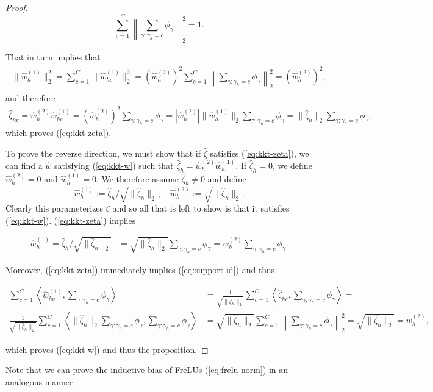 \documentclass{article}
\theoremstyle{plain}
\theoremstyle{definition}
\theoremstyle{remark}
\begin{document}
\begin{proof}
\begin{equation}
\label{eq:support-id}
\sum_{c=1}^C\left\|\sum_{\gamma:\gamma_h=c}\phi_{\gamma}\right\|_2^2=1.
\end{equation}

That in turn implies that
\begin{align}
\begin{aligned}
\label{w-12-id}
\|\hat{w}^{(1)}_h\|_2^2=\sum_{c=1}^C\|\hat{w}^{(1)}_{hc}\|_2^2=
\left(\hat{w}^{(2)}_h\right)^2\sum_{c=1}^C\left\|\sum_{\gamma:\gamma_h=c}\phi_{\gamma}\right\|_2^2=\left(\hat{w}^{(2)}_h\right)^2,
\end{aligned}
\end{align}
and therefore
\begin{align*}
\hat{\zeta}_{hc}=\hat{w}^{(2)}_h\hat{w}^{(1)}_{hc}=\left(\hat{w}^{(2)}_h\right)^2\sum_{\gamma:\gamma_h=c}\phi_{\gamma}=
|\hat{w}_h^{(2)}|\|\hat{w}_h^{(1)}\|_2\sum_{\gamma:\gamma_h=c}\phi_{\gamma}=\|\hat{\zeta}_{h}\|_2\sum_{\gamma:\gamma_h=c}\phi_{\gamma},
\end{align*}
which proves (\ref{eq:kkt-zeta}).

To prove the reverse direction, we must show that if $\hat{\zeta}$ satisfies (\ref{eq:kkt-zeta}), we can find a $\hat{w}$ satisfying (\ref{eq:kkt-w}) such that $\hat{\zeta}_h=\hat{w}_h^{(2)}\hat{w}_h^{(1)}$.
If $\hat{\zeta}_h=0$, we define $\hat{w}_h^{(2)}=0$ and $\hat{w}_h^{(1)}=0$. We therefore assume $\hat{\zeta}_h\neq0$ and define
\begin{equation}
\label{zeta-to-w}
    \hat{w}^{(1)}_h:=\hat{\zeta}_h/\sqrt{\|\hat{\zeta}_h\|_2},\quad
    \hat{w}^{(2)}_h:=\sqrt{\|\hat{\zeta}_h\|_2}.
\end{equation}
Clearly this parameterizes $\zeta$ and so all that is left to show is that it satisfies (\ref{eq:kkt-w}).
(\ref{eq:kkt-zeta}) implies

\begin{align*}
\hat{w}_h^{(1)}=\hat{\zeta}_h/\sqrt{\|\hat{\zeta}_h\|_2}&=\sqrt{\|\hat{\zeta}_h\|_2}\sum_{\gamma:\gamma_h=c}\phi_{\gamma}=w^{(2)}_h\sum_{\gamma:\gamma_h=c}\phi_{\gamma}.
\end{align*}

Moreover, (\ref{eq:kkt-zeta}) immediately implies (\ref{eq:support-id}) and thus

\begin{align*}
\sum_{c=1}^C\left\langle \hat{w}^{(1)}_{hc},\sum_{\gamma:\gamma_h=c}\phi_{\gamma}\right\rangle&=
\frac{1}{\sqrt{\|\hat{\zeta}_h\|_2}}\sum_{c=1}^C\left\langle \hat{\zeta}_{hc},\sum_{\gamma:\gamma_h=c}\phi_{\gamma}\right\rangle=\\
\frac{1}{\sqrt{\|\hat{\zeta}_h\|_2}}\sum_{c=1}^C\left\langle \|\hat{\zeta}_{h}\|_2\sum_{\gamma:\gamma_h=c}\phi_{\gamma},\sum_{\gamma:\gamma_h=c}\phi_{\gamma}\right\rangle&=
\sqrt{\|\hat{\zeta}_h\|_2}\sum_{c=1}^C\left\|\sum_{\gamma:\gamma_h=c}\phi_{\gamma}\right\|_2^2
=\sqrt{\|\hat{\zeta}_h\|_2}=w^{(2)}_h,
\end{align*}

which proves (\ref{eq:kkt-w}) and thus the proposition.
\end{proof}
Note that we can prove the inductive bias of FreLUs (\ref{eq:frelu-norm}) in an analogous manner.
\end{document}
